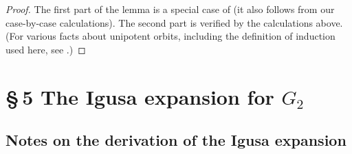 \documentclass[12pt,letterpaper]{amsart}
\begin{document}
\begin{proof} The first part of the lemma is a special case of
\cite[ch II, Proposition 9.1]{Ha92a} (it also follows
from our case-by-case calculations).
The second part is verified
by the calculations above. (For various
facts about unipotent orbits, including the definition of
induction used here, see \cite{Spa82}.)
\end{proof}

\section*{\S\,5 The Igusa expansion for $G_2$}

\subsection*{Notes on the derivation of the Igusa expansion}
\end{document}
